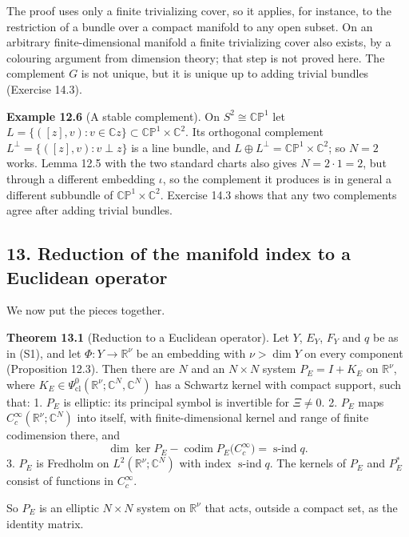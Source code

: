 \documentclass[
  11pt,
]{article}
\begin{document}
The proof uses only a finite trivializing cover, so it applies, for
instance, to the restriction of a bundle over a compact manifold to any
open subset. On an arbitrary finite-dimensional manifold a finite
trivializing cover also exists, by a colouring argument from dimension
theory; that step is not proved here. The complement \(G\) is not
unique, but it is unique up to adding trivial bundles (Exercise 14.3).

\textbf{Example 12.6} (A stable complement). On
\(S^2\cong\mathbb{CP}^1\) let
\(L=\{([z],v):v\in\mathbb Cz\}\subset\mathbb{CP}^1\times\mathbb C^2\).
Its orthogonal complement \(L^\perp=\{([z],v):v\perp z\}\) is a line
bundle, and \(L\oplus L^\perp=\mathbb{CP}^1\times\mathbb C^2\); so
\(N=2\) works. Lemma 12.5 with the two standard charts also gives
\(N=2\cdot1=2\), but through a different embedding \(\iota\), so the
complement it produces is in general a different subbundle of
\(\mathbb{CP}^1\times\mathbb C^2\). Exercise 14.3 shows that any two
complements agree after adding trivial bundles.

\subsection{13. Reduction of the manifold index to a Euclidean
operator}\label{reduction-of-the-manifold-index-to-a-euclidean-operator}

We now put the pieces together.

\textbf{Theorem 13.1} (Reduction to a Euclidean operator). Let \(Y\),
\(E_Y\), \(F_Y\) and \(q\) be as in (S1), and let
\(\Phi:Y\to\mathbb R^\nu\) be an embedding with \(\nu>\dim Y\) on every
component (Proposition 12.3). Then there are \(N\) and an \(N\times N\)
system \(P_E=I+K_E\) on \(\mathbb R^\nu\), where
\(K_E\in\Psi^0_{\mathrm{cl}}(\mathbb R^\nu;\mathbb C^N,\mathbb C^N)\)
has a Schwartz kernel with compact support, such that: 1. \(P_E\) is
elliptic: its principal symbol is invertible for \(\Xi\ne0\). 2. \(P_E\)
maps \(C_c^\infty(\mathbb R^\nu;\mathbb C^N)\) into itself, with
finite-dimensional kernel and range of finite codimension there, and \[
\dim\ker P_E-\operatorname{codim}P_E\bigl(C_c^\infty\bigr)=\operatorname{s-ind}q .
\tag{13.1}
\] 3. \(P_E\) is Fredholm on \(L^2(\mathbb R^\nu;\mathbb C^N)\) with
index \(\operatorname{s-ind}q\). The kernels of \(P_E\) and \(P_E^*\)
consist of functions in \(C_c^\infty\).

So \(P_E\) is an elliptic \(N\times N\) system on \(\mathbb R^\nu\) that
acts, outside a compact set, as the identity matrix.
\end{document}
